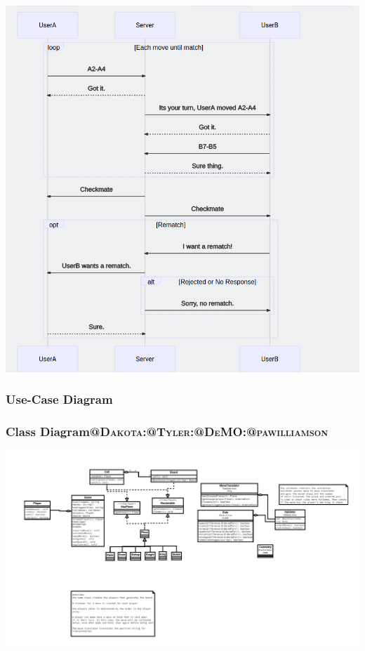 \documentclass[11pt]{article}
\begin{document}
\begin{center}
\includegraphics[width=.9\linewidth]{present/Sequence3.png}
\end{center}
\subsubsection{Use-Case Diagram}
\label{sec:org5cf3823}

\subsubsection{Class Diagram\hfill{}\textsc{@Dakota:@Tyler:@DeMO:@pawilliamson}}
\label{sec:orgcba25bc}
\begin{center}
\includegraphics[width=.9\linewidth]{present/ClassDiagram.png}
\end{center}
\end{document}
